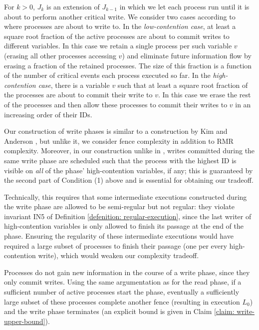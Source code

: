 For $k>0$, $J_k$ is an extension of $J_{k-1}$ in which we let each process run until it is about to perform another critical write. We consider two cases according to where processes are about to write to. In the \emph{low-contention case}, at least a square root fraction of the active processes are about to commit writes to different variables. In this case we retain a single process per such variable $v$ (erasing all other processes accessing $v$) and eliminate future information flow by erasing a fraction of the retained processes. The size of this fraction is a function of the number of critical events each process executed so far. In the \emph{high-contention case}, there is a variable $v$ such that at least a square root fraction of the processes are about to commit their write to $v$. In this case we erase the rest of the processes and then allow these processes to commit their writes to $v$ in an increasing order of their IDs.

Our construction of write phases is similar to a construction by Kim and Anderson \cite{DBLP:journals/dc/KimA12}, but unlike it, we consider fence complexity in addition to RMR complexity. Moreover, in our construction unlike in \cite{DBLP:journals/dc/KimA12}, writes committed during the same write phase are scheduled such that the process with the highest ID is visible on \textit{all} of the phase' high-contention variables, if any; this is guaranteed by the second part of Condition (1) above and is essential for obtaining our tradeoff.

Technically, this requires that some intermediate executions constructed during the write phase are allowed to be semi-regular but not regular: they violate invariant IN5 of Definition \ref{defenition: regular-execution}, since the last writer of high-contention variables is only allowed to finish its passage at the end of the phase. Ensuring the regularity of these intermediate executions would have required a large subset of processes to finish their passage (one per every high-contention write), which would weaken our complexity tradeoff.

Processes do not gain new information in the course of a write phase, since they only commit writes. Using the same argumentation as for the read phase, if a sufficient number of active processes start the phase, eventually a sufficiently large subset of these processes complete another fence (resulting in execution $L_0$) and the write phase terminates (an explicit bound is given in Claim
\ref{claim: write-upper-bound}).



